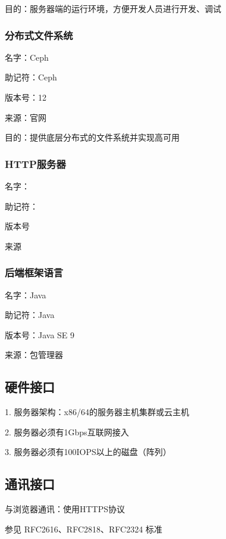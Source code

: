目的：服务器端的运行环境，方便开发人员进行开发、调试

\subsubsection{分布式文件系统}

名字：Ceph

助记符：Ceph

版本号：12

来源：官网

目的：提供底层分布式的文件系统并实现高可用

\subsubsection{HTTP服务器}

名字：

助记符：

版本号

来源

\subsubsection{后端框架语言}

名字：Java

助记符：Java

版本号：Java SE 9

来源：包管理器 

\subsection{硬件接口}

1. 服务器架构：x86/64的服务器主机集群或云主机

2. 服务器必须有1Gbps互联网接入

3. 服务器必须有100IOPS以上的磁盘（阵列）

\subsection{通讯接口}

与浏览器通讯：使用HTTPS协议

参见 RFC2616、RFC2818、RFC2324 标准



